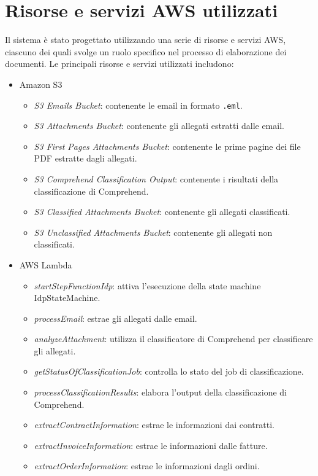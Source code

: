 \section{Risorse e servizi AWS utilizzati}
\label{sec:risorse-servizi-aws}
Il sistema è stato progettato utilizzando una serie di risorse e servizi AWS, ciascuno dei quali svolge un ruolo specifico nel processo di elaborazione dei documenti. Le principali risorse e servizi utilizzati includono:
\begin{itemize}
    \item Amazon S3
    \begin{itemize}
        \item \emph{S3 Emails Bucket}: contenente le email in formato \texttt{.eml}.
        \item \emph{S3 Attachments Bucket}: contenente gli allegati estratti dalle email.
        \item \emph{S3 First Pages Attachments Bucket}: contenente le prime pagine dei file PDF estratte dagli allegati.
        \item \emph{S3 Comprehend Classification Output}: contenente i risultati della classificazione di Comprehend.
        \item \emph{S3 Classified Attachments Bucket}: contenente gli allegati classificati.
        \item \emph{S3 Unclassified Attachments Bucket}: contenente gli allegati non classificati.
    \end{itemize}
    \item AWS Lambda
    \begin{itemize}
        \item \emph{startStepFunctionIdp}: attiva l'esecuzione della state machine IdpStateMachine.
        \item \emph{processEmail}: estrae gli allegati dalle email.
        \item \emph{analyzeAttachment}: utilizza il classificatore di Comprehend per classificare gli allegati.
        \item \emph{getStatusOfClassificationJob}: controlla lo stato del job di classificazione.
        \item \emph{processClassificationResults}: elabora l'output della classificazione di Comprehend.
        \item \emph{extractContractInformation}: estrae le informazioni dai contratti.
        \item \emph{extractInvoiceInformation}: estrae le informazioni dalle fatture.
        \item \emph{extractOrderInformation}: estrae le informazioni dagli ordini.

\end{itemize}
\end{itemize}
